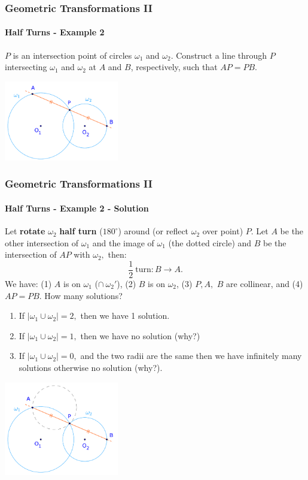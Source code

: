 \documentclass[8pt,xcolor=table,dvipsnames]{beamer}
\newcommand{\dg}{^\circ}
\begin{document}
\begin{frame}[t]
    \frametitle{Geometric Transformations II}
    \framesubtitle{Half Turns - Example 2}
    \begin{example}
        $P$ is an intersection point of circles $\omega_1$ and $\omega_2$.
        Construct a line through $P$ intersecting $\omega_1$ and $\omega_2$ at $A$ and $B$, respectively,
        such that $AP = PB.$
    \end{example}

    \bigbreak
    \begin{center}
        \includegraphics[width=5cm]{./svg/pdf/rotation-1a.pdf}
    \end{center}
\end{frame}

\begin{frame}[t]
    \frametitle{Geometric Transformations II}
    \framesubtitle{Half Turns - Example 2 - Solution}
    \begin{overprint}
        Let \textbf{rotate} $\omega_2$ \textbf{half turn} ($180\dg$) around (or reflect $\omega_2$ over point) $P$.
        \bigbreak
        Let $A$ be the other intersection of $\omega_1$ and the image of $\omega_1$ (the dotted circle)
        and $B$ be the intersection of $AP$ with $\omega_2,$ then:
        \[
            \frac{1}{2}\ \text{turn}: B \rightarrow A.
        \]
        \bigbreak
        We have: (1) $A$ is on $\omega_1$ ($\cap\ \omega_2'$), (2) $B$ is on $\omega_2$, (3) $P, A,$ $B$ are collinear,
        and (4) $AP = PB$.
        How many solutions?
        \begin{enumerate}
            \item If $|\omega_1 \cup \omega_2| = 2,$ then we have 1 solution.
            \item If $|\omega_1 \cup \omega_2| = 1,$ then we have no solution (why?)
            \item If $|\omega_1 \cup \omega_2| = 0,$ and the two radii are the same then we have infinitely many solutions
            otherwise no solution (why?).
        \end{enumerate}
    \end{overprint}    
    \begin{center}
        \includegraphics[width=5cm]{./svg/pdf/rotation-1b.pdf}
    \end{center}
\end{frame}
\end{document}
